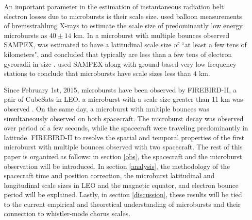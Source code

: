 \documentclass[draft, linenumbers]{agujournal}
\begin{document}
An important parameter in the estimation of instantaneous radiation belt electron losses due to microbursts is their scale size. \citet{Parks1967} used balloon measurements of bremsstrahlung X-rays to estimate the scale size of predominantly low energy microbursts as $40 \pm 14$ km. In \citet{Blake1996} a microburst with multiple bounces  observed   SAMPEX, was estimated to have a latitudinal scale size of ``at least a few tens of kilometers", and  concluded that typically  are less than a few tens of electron gyroradii in size . \citet{Dietrich2010} used SAMPEX along with ground-based very low frequency stations to conclude that microbursts have scale sizes less than $4$ km.

Since February 1st, 2015, microbursts have been observed by FIREBIRD-II, a pair of CubeSats in LEO.  a microburst with a scale size greater than 11 km was observed \citep{Crew2016}. On the same day, a microburst with multiple bounces was simultaneously observed on both spacecraft. The microburst decay was observed over  period of a few seconds, while the spacecraft were traveling predominantly in latitude.  FIREBIRD-II to resolve the spatial and temporal properties of the first microburst with multiple bounces observed with two spacecraft. The rest of this paper is organized as follows: in section \ref{obs}, the spacecraft and the microburst observation will be introduced. In section \ref{analysis}, the methodology of the spacecraft time and position correction, the microburst latitudinal and longitudinal scale sizes in LEO and the magnetic equator, and electron bounce period will be explained. Lastly, in section \ref{discussion}, these results will be tied to the current empirical and theoretical understanding of microbursts and their connection to whistler-mode chorus scales.
\end{document}
